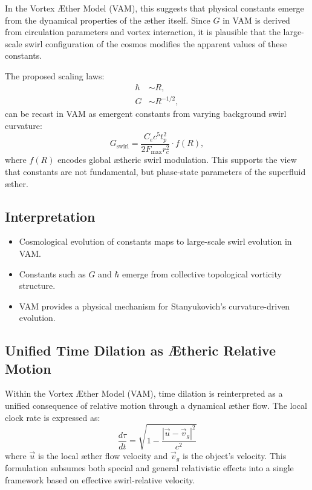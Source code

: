 \documentclass[12pt]{article}
\begin{document}
            In the Vortex \AE ther Model (VAM), this suggests that physical constants emerge from the dynamical properties of the æther itself. Since $G$ in VAM is derived from circulation parameters and vortex interaction, it is plausible that the large-scale swirl configuration of the cosmos modifies the apparent values of these constants.

            The proposed scaling laws:
            \begin{align*}
            \hbar &\sim R, \\
            G &\sim R^{-1/2},
            \end{align*}
            can be recast in VAM as emergent constants from varying background swirl curvature:
            \begin{equation}
            G_\text{swirl} = \frac{C_e c^5 t_p^2}{2 F_\text{max} r_c^2} \cdot f(R),
            \end{equation}
            where $f(R)$ encodes global ætheric swirl modulation. This supports the view that constants are not fundamental, but phase-state parameters of the superfluid æther.

            \subsection*{Interpretation}
            \begin{itemize}
            \item Cosmological evolution of constants maps to large-scale swirl evolution in VAM.
            \item Constants such as $G$ and $\hbar$ emerge from collective topological vorticity structure.
            \item VAM provides a physical mechanism for Stanyukovich’s curvature-driven evolution.
            \end{itemize}

            \subsection*{Unified Time Dilation as Ætheric Relative Motion}
            Within the Vortex Æther Model (VAM), time dilation is reinterpreted as a unified consequence of relative motion through a dynamical æther flow. The local clock rate is expressed as:
            \[
                \frac{d\tau}{dt} = \sqrt{1 - \frac{|\vec{u} - \vec{v}_g|^2}{c^2}}
            \]
            where $\vec{u}$ is the local æther flow velocity and $\vec{v}_g$ is the object's velocity. This formulation subsumes both special and general relativistic effects into a single framework based on effective swirl-relative velocity.
\end{document}
